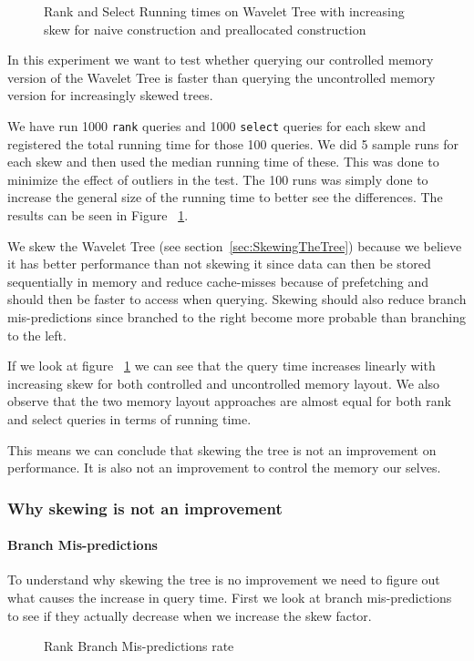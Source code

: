 \begin{figure}
\caption{Rank and Select Running times on Wavelet Tree with increasing skew for naive construction and preallocated construction}
\label{fig:NaiveRankSelectSkewRunningTime}

\end{figure}


In this experiment we want to test whether querying our controlled memory version of the Wavelet Tree is faster than querying the uncontrolled memory version for increasingly skewed trees. 

We have run 1000 \texttt{rank} queries and 1000 \texttt{select} queries for each skew and registered the total running time for those 100 queries. 
We did 5 sample runs for each skew and then used the median running time of these. 
This was done to minimize the effect of outliers in the test. The 100 runs was simply done to increase the general size of the running time to better see the differences. The results can be seen in Figure ~\ref{fig:NaiveRankSelectSkewRunningTime}.

We skew the Wavelet Tree (see section~\ref{sec:SkewingTheTree}) because we believe it has better performance than not skewing it since data can then be stored sequentially in memory and reduce cache-misses because of prefetching and should then be faster to access when querying. 
Skewing should also reduce branch mis-predictions since branched to the right become more probable than branching to the left. 


If we look at figure ~\ref{fig:NaiveRankSelectSkewRunningTime} we can see that the query time increases linearly with increasing skew for both controlled and uncontrolled memory layout. We also observe that the two memory layout approaches are almost equal for both rank and select queries in terms of running time.

This means we can conclude that skewing the tree is not an improvement on performance. It is also not an improvement to control the memory our selves.

\subsubsection{Why skewing is not an improvement}
\paragraph{Branch Mis-predictions}
To understand why skewing the tree is no improvement we need to figure out what causes the increase in query time. 
First we look at branch mis-predictions to see if they actually decrease when we increase the skew factor. 
\begin{figure}
\caption{Rank Branch Mis-predictions rate}
\label{fig:NaiveVsPreallocatedSkewRankQueryBMrate}

\end{figure}

